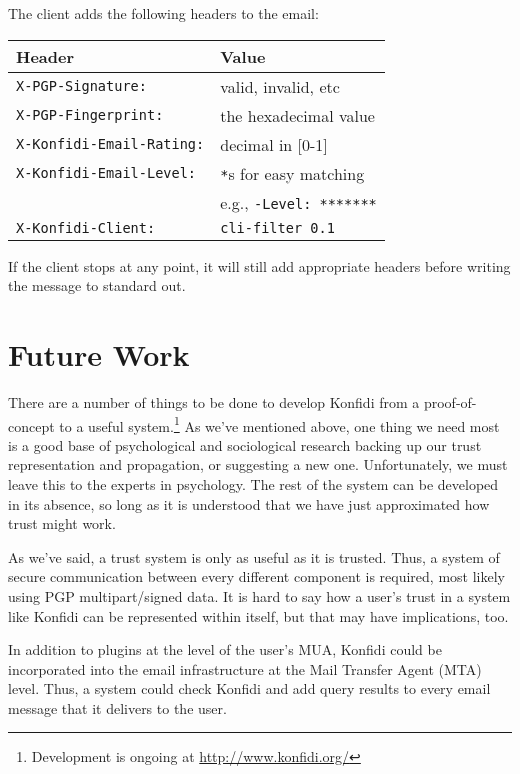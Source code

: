 \documentclass[letterpaper]{www2006-submission}
\begin{document}
The client adds the following headers to the email:
\begin{center}
\begin{tabular}{ll}
\textbf{Header} & \textbf{Value} \\
\hline
\texttt{X-PGP-Signature:}        & valid, invalid, etc \\
\texttt{X-PGP-Fingerprint:}      & the hexadecimal value \\
\texttt{X-Konfidi-Email-Rating:} & decimal in [0-1] \\
\texttt{X-Konfidi-Email-Level:}  & \texttt{*}s for easy matching \\
                                 & e.g., \texttt{-Level: *******} \\
\texttt{X-Konfidi-Client:}       & \texttt{cli-filter 0.1} \\
\end{tabular}
\end{center}

If the client stops at any point, it will still add appropriate headers before writing the message to standard out.

\section{Future Work}
There are a number of things to be done to develop Konfidi from a proof-of-concept to a useful system.\footnote{Development is ongoing at \url{http://www.konfidi.org/}}  As we've mentioned above, one thing we need most is a good base of psychological and sociological research backing up our trust representation and propagation, or suggesting a new one.  Unfortunately, we must leave this to the experts in psychology.  The rest of the system can be developed in its absence, so long as it is understood that we have just approximated how trust might work.

As we've said, a trust system is only as useful as it is trusted.  Thus, a system of secure communication between every different component is required, most likely using PGP multipart/signed data.  It is hard to say how a user's trust in a system like Konfidi can be represented within itself, but that may have implications, too.

In addition to plugins at the level of the user's MUA, Konfidi could be incorporated into the email infrastructure at the Mail Transfer Agent (MTA) level.  Thus, a system could check Konfidi and add query results to every email message that it delivers to the user.
\end{document}
